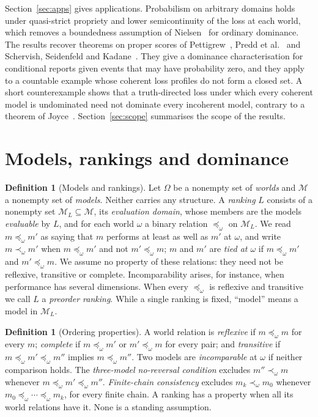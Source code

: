 \documentclass[11pt]{article}
\theoremstyle{definition}
\newtheorem{definition}[theorem]{Definition}
\theoremstyle{remark}
\newcommand{\M}{\mathcal M}
\begin{document}
Section~\ref{sec:apps} gives applications. Probabilism on arbitrary domains holds under quasi-strict propriety and lower semicontinuity of the loss at each world, which removes a boundedness assumption of Nielsen~\cite{Nielsen} for ordinary dominance. The results recover theorems on proper scores of Pettigrew~\cite{Pettigrew}, Predd et al.~\cite{Predd} and Schervish, Seidenfeld and Kadane~\cite{SSK09}. They give a dominance characterisation for conditional reports given events that may have probability zero, and they apply to a countable example whose coherent loss profiles do not form a closed set. A short counterexample shows that a truth-directed loss under which every coherent model is undominated need not dominate every incoherent model, contrary to a theorem of Joyce~\cite{Joyce}. Section~\ref{sec:scope} summarises the scope of the results.

\section{Models, rankings and dominance}\label{sec:setting}

\begin{definition}[Models and rankings]\label{def:rankings}
Let $\Omega$ be a nonempty set of \emph{worlds} and $\M$ a nonempty set of \emph{models}. Neither carries any structure. A \emph{ranking} $L$ consists of a nonempty set $\M_L\subseteq\M$, its \emph{evaluation domain}, whose members are the models \emph{evaluable} by $L$, and for each world $\omega$ a binary relation $\preceq_\omega$ on $\M_L$. We read $m\preceq_\omega m'$ as saying that $m$ performs at least as well as $m'$ at $\omega$, and write $m\prec_\omega m'$ when $m\preceq_\omega m'$ and not $m'\preceq_\omega m$; $m$ and $m'$ are \emph{tied at $\omega$} if $m\preceq_\omega m'$ and $m'\preceq_\omega m$. We assume no property of these relations: they need not be reflexive, transitive or complete. Incomparability arises, for instance, when performance has several dimensions. When every $\preceq_\omega$ is reflexive and transitive we call $L$ a \emph{preorder ranking}. While a single ranking is fixed, ``model'' means a model in $\M_L$.
\end{definition}

\begin{definition}[Ordering properties]\label{def:ordering}
A world relation is \emph{reflexive} if $m\preceq_\omega m$ for every $m$;
\emph{complete} if $m\preceq_\omega m'$ or $m'\preceq_\omega m$ for every pair; and
\emph{transitive} if $m\preceq_\omega m'\preceq_\omega m''$ implies $m\preceq_\omega m''$.
Two models are \emph{incomparable} at $\omega$ if neither comparison holds.
The \emph{three-model no-reversal condition} excludes $m''\prec_\omega m$ whenever
$m\preceq_\omega m'\preceq_\omega m''$.
\emph{Finite-chain consistency} excludes $m_k\prec_\omega m_0$ whenever
$m_0\preceq_\omega\cdots\preceq_\omega m_k$, for every finite chain.
A ranking has a property when all its world relations have it. None is a standing assumption.
\end{definition}
\end{document}
